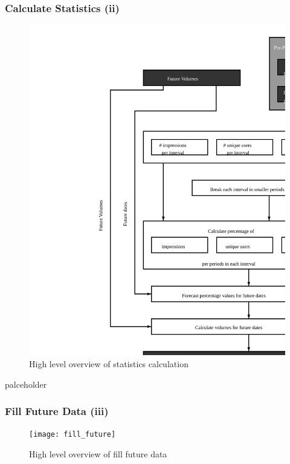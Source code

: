 \subsubsection{Calculate Statistics (ii)}\label{subsubsec:stats}

\begin{figure}[h] \begin{center} \leavevmode
\includegraphics[]{calculate_stats} \caption{ High level overview
of statistics calculation} \label{fig:calculate_stats_ii} \end{center} \end{figure}

palceholder

\subsubsection{Fill Future Data (iii)}\label{subsubsec:fill_data}

\begin{figure}[h] \begin{center} \leavevmode
\texttt{[image: fill\_future]} \caption{ High level overview
of fill future data} \label{fig:fill_future_iii} \end{center} \end{figure}

